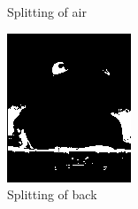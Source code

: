 \documentclass{article}
\begin{document}
\begin{figure}[htb]
\begin{subfigure}[b]{0.24\linewidth}
    \caption{Splitting of air}
  \end{subfigure}
  \begin{subfigure}[b]{0.24\linewidth}
    \includegraphics[width=\linewidth]{images/toad_split_center.png}
    \caption{Splitting of back}
  \end{subfigure}
  \begin{subfigure}[b]{0.24\linewidth}

\end{subfigure}
\end{figure}
\end{document}
